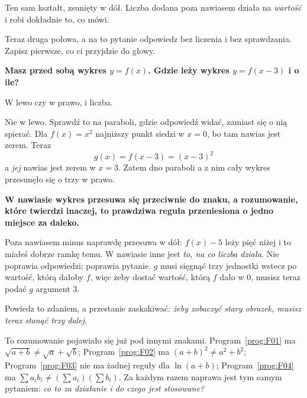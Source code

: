 \begin{fr}
Ten sam kształt, zsunięty w dół. Liczba dodana poza nawiasem działa na
\emph{wartość} i robi dokładnie to, co mówi.

Teraz druga połowa, a na to pytanie odpowiedz bez liczenia i bez sprawdzania.
Zapisz pierwsze, co ci przyjdzie do głowy.

\textbf{Masz przed sobą wykres $y = f(x)$. Gdzie leży wykres $y = f(x - 3)$ i o
ile?}

W lewo czy w prawo, i liczba.
\dotline
\nextframe
\end{fr}

\begin{fr}
Nie w lewo. Sprawdź to na paraboli, gdzie odpowiedź widać, zamiast się o nią
spierać. Dla $f(x) = x^{2}$ najniższy punkt siedzi w $x = 0$, bo tam nawias
jest zerem. Teraz
\[ g(x) = f(x - 3) = (x - 3)^{2} \]
a \emph{jej} nawias jest zerem w $x = 3$. Zatem dno paraboli \dash{} a z nim
cały wykres \dash{} przesunęło się o trzy w prawo.

\begin{trapbox}
\textbf{W nawiasie wykres przesuwa się przeciwnie do znaku, a rozumowanie,
które twierdzi inaczej, to prawdziwa reguła przeniesiona o jedno miejsce za
daleko.}

Poza nawiasem minus naprawdę przesuwa w dół: $f(x) - 5$ leży pięć niżej i to
miałeś dobrze ramkę temu. W nawiasie inne jest \emph{to, na co liczba działa}.
Nie poprawia odpowiedzi; poprawia pytanie. $g$ musi sięgnąć trzy jednostki
wstecz po wartość, którą dałoby $f$, więc żeby dostać wartość, którą $f$ dało w
$0$, musisz teraz podać $g$ argument $3$.

Powiedz to zdaniem, a przestanie zaskakiwać: \emph{żeby zobaczyć stary obrazek,
musisz teraz stanąć trzy dalej}.

To rozumowanie pojawiało się już pod innymi znakami.
Program~\ref{prog:F01} ma $\sqrt{a+b} \ne \sqrt{a} + \sqrt{b}$;
Program~\ref{prog:F02} ma $(a+b)^{2} \ne a^{2} + b^{2}$;
Program~\ref{prog:F03} nie ma żadnej reguły dla $\ln(a+b)$;
Program~\ref{prog:F04} ma $\sum a_i b_i \ne (\sum a_i)(\sum b_i)$. Za każdym
razem naprawa jest tym samym pytaniem: \emph{co to za działanie i do czego jest
stosowane?}
\end{trapbox}
\end{fr}

